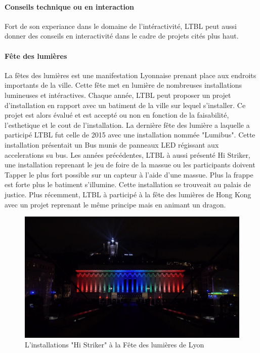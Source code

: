 \documentclass{article}
\begin{document}
\paragraph{Conseils technique ou en interaction} Fort de son experiance dans le domaine de l'intéractivité, LTBL peut aussi donner des conseils en interactivité dans le cadre de projets cités plus haut.

\paragraph{Fête des lumières} La fêtes des lumières est une manifestation Lyonnaise prenant place aux endroits importants de la ville.
Cette fête met en lumière de nombreuses installations lumineuses et intéractives.
Chaque année, LTBL peut proposer un projet d'installation en rapport avec un batiment de la ville sur lequel s'installer.
Ce projet est alors évalué et est accepté ou non en fonction de la faisabilité, l'esthetique et le cout de l'installation.
La dernière fête des lumière a laquelle a participé LTBL fut celle de 2015 avec une installation nommée "Lumibus".
Cette installation présentait un Bus munis de panneaux LED régissant aux accelerations su bus.
Les années précédentes, LTBL à aussi présenté Hi Striker, une installation reprenant le jeu de foire de la massue ou les participants doivent Tapper le plus fort possible sur un capteur à l'aide d'une massue.
Plus la frappe est forte plus le batiment s'illumine.
Cette installation se trouveait au palais de justice.
Plus récemment, LTBL à participé à la fête des lumières de Hong Kong avec un projet reprenant le même principe mais en animant un dragon.

\begin{figure}[h]
    \centering
    \includegraphics[scale=0.2]{hi-striker.png}
    \caption{L'installations "Hi Striker" à la Fête des lumières de Lyon}
\end{figure}
\end{document}
